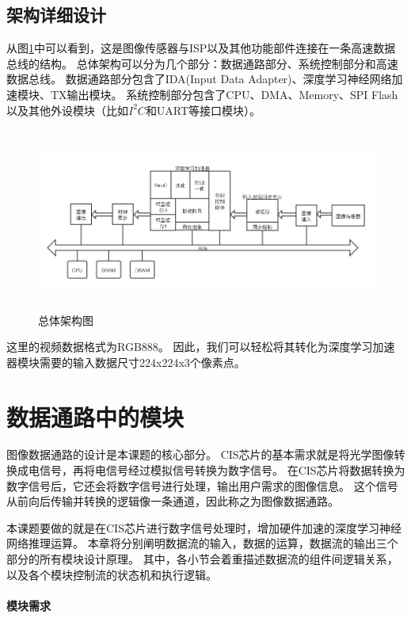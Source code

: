 \subsection{架构详细设计}
从图\ref{fig:top_arch}中可以看到，这是图像传感器与ISP以及其他功能部件连接在一条高速数据总线的结构。
总体架构可以分为几个部分：数据通路部分、系统控制部分和高速数据总线。
数据通路部分包含了IDA(Input Data Adapter)、深度学习神经网络加速模块、TX输出模块。
系统控制部分包含了CPU、DMA、Memory、SPI Flash以及其他外设模块（比如$I^2C$和UART等接口模块）。
\begin{figure}[htbp]
    \centering
    \includegraphics[width=15cm,height=6cm]{figures/top_arch.png}
    \caption{总体架构图}
    \label{fig:top_arch}
\end{figure}
这里的视频数据格式为RGB888。
因此，我们可以轻松将其转化为深度学习加速器模块需要的输入数据尺寸224x224x3个像素点。




\section{数据通路中的模块}
图像数据通路的设计是本课题的核心部分。
CIS芯片的基本需求就是将光学图像转换成电信号，再将电信号经过模拟信号转换为数字信号。
在CIS芯片将数据转换为数字信号后，它还会将数字信号进行处理，输出用户需求的图像信息。
这个信号从前向后传输并转换的逻辑像一条通道，因此称之为图像数据通路。

本课题要做的就是在CIS芯片进行数字信号处理时，增加硬件加速的深度学习神经网络推理运算。
本章将分别阐明数据流的输入，数据的运算，数据流的输出三个部分的所有模块设计原理。
其中，各小节会着重描述数据流的组件间逻辑关系，以及各个模块控制流的状态机和执行逻辑。

\paragraph{模块需求}

